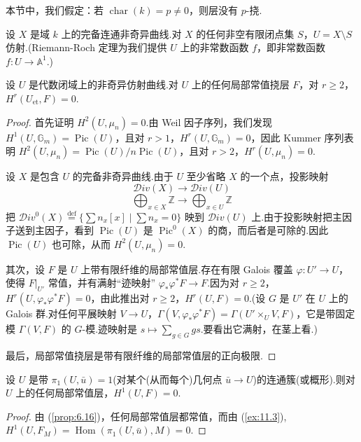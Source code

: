本节中，我们假定：若 $\operatorname{char}(k) = p \neq 0$，则层没有 $p$-挠.

设 $X$ 是域 $k$ 上的完备连通非奇异曲线.对 $X$ 的任何非空有限闭点集 $S$，$U = X \setminus S$ 仿射.(Riemann-Roch 定理为我们提供 $U$ 上的非常数函数 $f$，即非常数函数 $f \colon U \to \mathbb{A}^{1}$.)

\begin{proposition}\label{prop:14.12}
设 $U$ 是代数闭域上的非奇异仿射曲线.对 $U$ 上的任何局部常值挠层 $F$，对 $r \geq 2$，$H^{r}(U_{\mathrm{et}}, F) = 0$.
\end{proposition}

\begin{proof}
首先证明 $H^{2}(U, \mu_n) = 0$.由 Weil 因子序列，我们发现 $H^{1}(U, \mathbb{G}_{m}) = \operatorname{Pic}(U)$，且对 $r > 1$，$H^{r}(U, \mathbb{G}_{m}) = 0$，因此 Kummer 序列表明 $H^{2}(U, \mu_n) = \operatorname{Pic}(U)/n\operatorname{Pic}(U)$，且对 $r > 2$，$H^{r}(U, \mu_n) = 0$.

设 $X$ 是包含 $U$ 的完备非奇异曲线.由于 $U$ 至少省略 $X$ 的一个点，投影映射
\[
\mathcal{D}iv(X) \to \mathcal{D}iv(U)
\]
\[
\bigoplus_{x \in X} \mathbb{Z} \to \bigoplus_{x \in U} \mathbb{Z}
\]
把 $\mathcal{D}iv^{0}(X) \overset{\mathrm{def}}{=} \{\sum n_x [x] \mid \sum n_x = 0\}$ 映到 $\mathcal{D}iv(U)$ 上.由于投影映射把主因子送到主因子，看到 $\operatorname{Pic}(U)$ 是 $\operatorname{Pic}^{0}(X)$ 的商，而后者是可除的.因此 $\operatorname{Pic}(U)$ 也可除，从而 $H^{2}(U, \mu_n) = 0$.

其次，设 $F$ 是 $U$ 上带有限纤维的局部常值层.存在有限 Galois 覆盖 $\varphi \colon U' \to U$，使得 $F|_{U'}$ 常值，并有满射``迹映射'' $\varphi_{*}\varphi^{*}F \to F$.因为对 $r \geq 2$，$H^{r}(U, \varphi_{*}\varphi^{*}F) = 0$，由此推出对 $r \geq 2$，$H^{r}(U, F) = 0$.(设 $G$ 是 $U'$ 在 $U$ 上的 Galois 群.对任何平展映射 $V \to U$，$\Gamma(V, \varphi_{*}\varphi^{*}F) = \Gamma(U' \times_{U} V, F)$，它是带固定模 $\Gamma(V, F)$ 的 $G$-模.迹映射是 $s \mapsto \sum_{g \in G} gs$.要看出它满射，在茎上看.)

最后，局部常值挠层是带有限纤维的局部常值层的正向极限.
\end{proof}

\begin{proposition}\label{prop:14.13}
设 $U$ 是带 $\pi_1(U, \bar{u}) = 1$(对某个(从而每个)几何点 $\bar{u} \to U$)的连通簇(或概形).则对 $U$ 上的任何局部常值层，$H^{1}(U, F) = 0$.
\end{proposition}

\begin{proof}
由 (\ref{prop:6.16})，任何局部常值层都常值，而由 (\ref{ex:11.3}), $H^{1}(U, F_M) = \operatorname{Hom}(\pi_1(U, \bar{u}), M) = 0$.
\end{proof}

